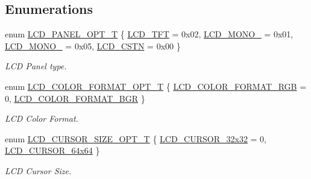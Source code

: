 \subsection*{Enumerations}
\begin{DoxyCompactItemize}
\item 
enum \hyperlink{group___l_c_d__18_x_x__43_x_x_gaceee4b8b7afdc1a97b365dc2feb4ecca}{L\+C\+D\+\_\+\+P\+A\+N\+E\+L\+\_\+\+O\+P\+T\+\_\+T} \{ \hyperlink{group___l_c_d__18_x_x__43_x_x_ggaceee4b8b7afdc1a97b365dc2feb4eccaa00e3399b074ff76827ba4bb796daf3b6}{L\+C\+D\+\_\+\+T\+FT} = 0x02, 
\hyperlink{group___l_c_d__18_x_x__43_x_x_ggaceee4b8b7afdc1a97b365dc2feb4eccaad2639cf608d91ec46b6cf2ce7a490494}{L\+C\+D\+\_\+\+M\+O\+N\+O\+\_} = 0x01, 
\hyperlink{group___l_c_d__18_x_x__43_x_x_ggaceee4b8b7afdc1a97b365dc2feb4eccaa92d1598a61d705cd7e2b2f0829977d33}{L\+C\+D\+\_\+\+M\+O\+N\+O\+\_} = 0x05, 
\hyperlink{group___l_c_d__18_x_x__43_x_x_ggaceee4b8b7afdc1a97b365dc2feb4eccaa015be97b134328f3b44403b8c28fa85e}{L\+C\+D\+\_\+\+C\+S\+TN} = 0x00
 \}\begin{DoxyCompactList}\small\item\em L\+CD Panel type. \end{DoxyCompactList}
\item 
enum \hyperlink{group___l_c_d__18_x_x__43_x_x_gac365c31cd880844cf31747394cd0f93a}{L\+C\+D\+\_\+\+C\+O\+L\+O\+R\+\_\+\+F\+O\+R\+M\+A\+T\+\_\+\+O\+P\+T\+\_\+T} \{ \hyperlink{group___l_c_d__18_x_x__43_x_x_ggac365c31cd880844cf31747394cd0f93aaaece371e0b75415f8d1827920f5c5a9e}{L\+C\+D\+\_\+\+C\+O\+L\+O\+R\+\_\+\+F\+O\+R\+M\+A\+T\+\_\+\+R\+GB} = 0, 
\hyperlink{group___l_c_d__18_x_x__43_x_x_ggac365c31cd880844cf31747394cd0f93aad4dec73fcfd38460506c7c9d244f2149}{L\+C\+D\+\_\+\+C\+O\+L\+O\+R\+\_\+\+F\+O\+R\+M\+A\+T\+\_\+\+B\+GR}
 \}\begin{DoxyCompactList}\small\item\em L\+CD Color Format. \end{DoxyCompactList}
\item 
enum \hyperlink{group___l_c_d__18_x_x__43_x_x_gacd66e01df306369e87e482a36a2cc66b}{L\+C\+D\+\_\+\+C\+U\+R\+S\+O\+R\+\_\+\+S\+I\+Z\+E\+\_\+\+O\+P\+T\+\_\+T} \{ \hyperlink{group___l_c_d__18_x_x__43_x_x_ggacd66e01df306369e87e482a36a2cc66ba5d1d44bda3d01e8e1c9a001bc1b56a28}{L\+C\+D\+\_\+\+C\+U\+R\+S\+O\+R\+\_\+32x32} = 0, 
\hyperlink{group___l_c_d__18_x_x__43_x_x_ggacd66e01df306369e87e482a36a2cc66ba68245535ad3b833e1cef4bee16deb95f}{L\+C\+D\+\_\+\+C\+U\+R\+S\+O\+R\+\_\+64x64}
 \}\begin{DoxyCompactList}\small\item\em L\+CD Cursor Size. \end{DoxyCompactList}
\end{DoxyCompactItemize}
